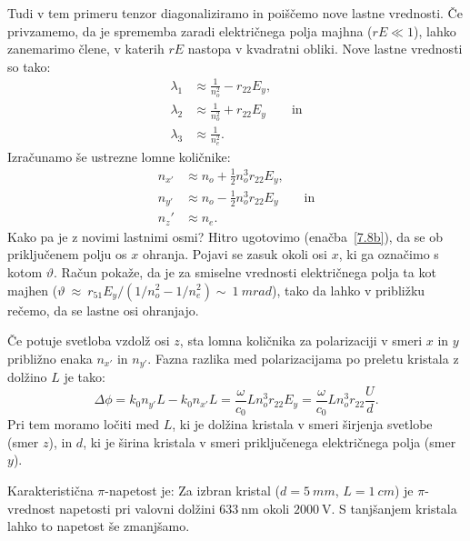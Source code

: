 Tudi v tem primeru tenzor diagonaliziramo in poiščemo nove lastne vrednosti.
Če privzamemo, da je sprememba zaradi električnega polja majhna ($rE\ll1$), lahko
zanemarimo člene, v katerih $rE$ nastopa v kvadratni obliki. Nove lastne vrednosti so tako:
\begin{align}
\lambda_1 &\approx \frac{1}{n_o^2}-r_{22}E_y, \\
\lambda_2 &\approx \frac{1}{n_o^2}+ r_{22}E_y\qquad \mathrm{in} \\
\lambda_3 &\approx \frac{1}{n_e^2}.
\end{align}
Izračunamo še ustrezne lomne količnike:
\begin{align}
n_{x'} &\approx n_o+\frac{1}{2}n_o^3r_{22}E_y,\\
n_{y'} &\approx n_o-\frac{1}{2}n_o^3r_{22}E_y \qquad \mathrm{in}\\
n_z' &\approx n_e.
\end{align}
Kako pa je z novimi lastnimi osmi? 
Hitro ugotovimo (enačba~\ref{7.8b}), da se ob
priključenem polju os $x$ ohranja. Pojavi se zasuk okoli osi $x$,
ki ga označimo s kotom $\vartheta$. Račun pokaže, da je za smiselne
vrednosti električnega polja ta kot majhen ($\vartheta~
\approx~r_{51}E_y/(1/n_o^2-1/n_e^2) \sim~1~\si{mrad}$),
tako da lahko v približku rečemo, da se lastne osi ohranjajo. 

Če potuje svetloba vzdolž osi $z$, sta lomna količnika za 
polarizaciji v smeri $x$ in $y$ približno enaka $n_{x'}$ in $n_{y'}$. Fazna razlika med 
polarizacijama po preletu kristala z dolžino $L$ je tako:
\begin{equation}
\Delta \phi = k_0 n_{y'} L - k_0 n_{x'} L = \frac{\omega}{c_0}L 
n_o^3 r_{22}E_y = \frac{\omega}{c_0}L n_o^3 r_{22}\frac{U}{d}.
\label{fazaTM}
\end{equation}
Pri tem moramo ločiti med $L$, ki je dolžina kristala v smeri širjenja svetlobe
(smer $z$), in $d$, ki je širina kristala v smeri priključenega električnega polja 
(smer $y$). 

Karakteristična $\pi$-napetost je:
Za izbran kristal ($d=5~\si{mm}$, $L=1~\si{cm}$) je $\pi$-vrednost 
napetosti pri valovni dolžini $633~\si{\nano\metre}$ okoli $2000~\si{\volt}$. S tanjšanjem
kristala lahko to napetost še zmanjšamo.


